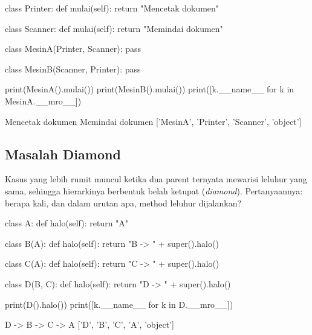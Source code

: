 \begin{kode}
class Printer:
    def mulai(self):
        return "Mencetak dokumen"

class Scanner:
    def mulai(self):
        return "Memindai dokumen"

class MesinA(Printer, Scanner):
    pass

class MesinB(Scanner, Printer):
    pass

print(MesinA().mulai())
print(MesinB().mulai())
print([k.__name__ for k in MesinA.__mro__])
\end{kode}

\begin{keluaran}
Mencetak dokumen
Memindai dokumen
['MesinA', 'Printer', 'Scanner', 'object']
\end{keluaran}

\subsection{Masalah Diamond}

Kasus yang lebih rumit muncul ketika dua parent ternyata mewarisi leluhur yang sama, sehingga hierarkinya berbentuk belah ketupat (\emph{diamond}). Pertanyaannya: berapa kali, dan dalam urutan apa, method leluhur dijalankan?

\begin{kode}
class A:
    def halo(self):
        return "A"

class B(A):
    def halo(self):
        return "B -> " + super().halo()

class C(A):
    def halo(self):
        return "C -> " + super().halo()

class D(B, C):
    def halo(self):
        return "D -> " + super().halo()

print(D().halo())
print([k.__name__ for k in D.__mro__])
\end{kode}

\begin{keluaran}
D -> B -> C -> A
['D', 'B', 'C', 'A', 'object']
\end{keluaran}

